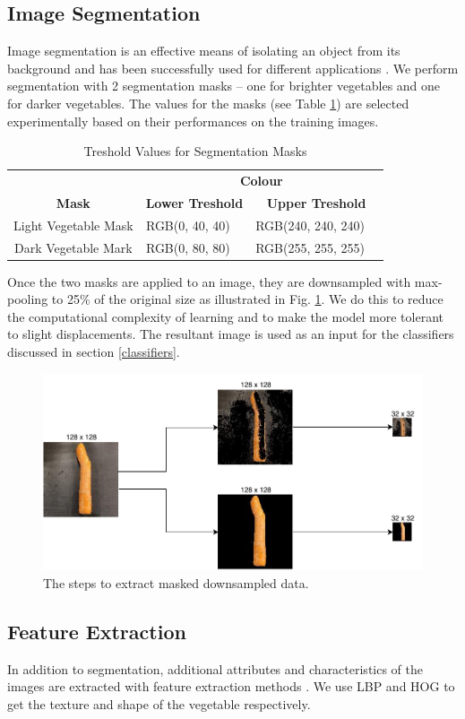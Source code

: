 \subsection{Image Segmentation}
Image segmentation is an effective means of isolating an object from its background and has been successfully used for different applications \cite{b4_1,b4_2,b4_3}. We perform segmentation with 2 segmentation masks -- one for brighter vegetables and one for darker vegetables. The values for the masks (see Table \ref{tab:mask_vals}) are selected experimentally based on their performances on the training images.

\bgroup
\def\arraystretch{1.5}
\begin{table}[htbp]
	\caption{Treshold Values for Segmentation Masks}
	\begin{center}
		\begin{tabular}{|c|c|c|c|c|}
			\hline
			& \multicolumn{4}{c|}{\textbf{Colour}}                                                         \\ \cline{2-5} 
			\multirow{-2}{*}{\textbf{Mask}} & \multicolumn{2}{c|}{\textbf{Lower Treshold}} & \multicolumn{2}{c|}{\textbf{Upper Treshold}}  \\ \hline
			Light Vegetable Mask            & RGB(0, 40, 40)   & \cellcolor[HTML]{002828}  & RGB(240, 240, 240) & \cellcolor[HTML]{F0F0F0} \\ \hline
			Dark Vegetable Mark             & RGB(0, 80, 80)   & \cellcolor[HTML]{005050}  & RGB(255, 255, 255) & \cellcolor[HTML]{FFFFFF} \\ \hline
		\end{tabular}
		\label{tab:mask_vals}
	\end{center}
\end{table}
\egroup

Once the two masks are applied to an image, they are downsampled with max-pooling to 25\% of the original size as illustrated in Fig. \ref{fig:mask}. We do this to reduce the computational complexity of learning and to make the model more tolerant to slight displacements. The resultant image is used as an input for the classifiers discussed in section \ref{classifiers}.

\begin{figure}[tp]
	\centerline{\includegraphics[scale=0.5]{./img/mask.pdf}}
	\caption{The steps to extract masked downsampled data.}
	\label{fig:mask}
\end{figure}

\subsection{Feature Extraction}
In addition to segmentation, additional attributes and characteristics of the images are extracted with feature extraction methods \cite{b4_4}. We use LBP and HOG to get the texture and shape of the vegetable respectively.